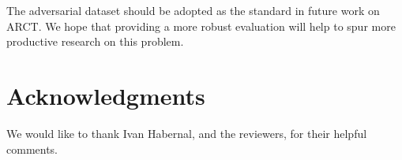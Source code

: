 \documentclass[11pt,a4paper]{article}
\begin{document}
The adversarial dataset should be adopted as the standard in future work on ARCT. We hope that providing a more robust evaluation will help to spur more productive research on this problem.

\section*{Acknowledgments}

We would like to thank Ivan Habernal, and the reviewers, for their helpful comments.




































\end{document}
